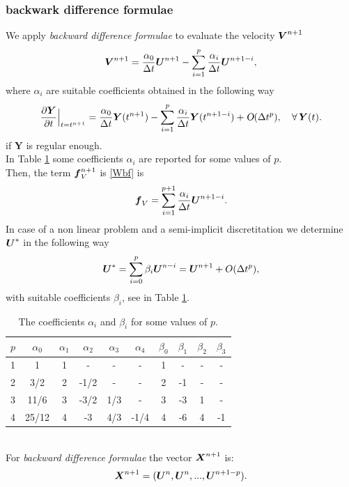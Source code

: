 \documentclass[english,a4paper]{article}
\newcommand{\Xbf}{\text{\mbox{\boldmath $X$}}}
\newcommand{\Ubf}{\text{\mbox{\boldmath $U$}}}
\newcommand{\fbf}{\text{\mbox{\boldmath $f$}}}
\newcommand{\Wbf}{\text{\mbox{\boldmath $V$}}}
\newcommand{\xx}{\boldsymbol}
\begin{document}
\subsubsection{backwark difference formulae}\label{bdf}%
We apply  {\sl backward difference formulae}  to evaluate  the velocity $\Wbf^{n+1}$
\begin{equation}
\Wbf^{n+1}= \frac{\alpha_0}{\Delta t}\Ubf^{n+1}-\sum_{i=1}^p\frac{\alpha_i}{\Delta t} \xx U^{n+1-i},
\end{equation}
where  $\alpha_i$  are suitable coefficients obtained in the
following way
\begin{equation*}
\frac{\partial \xx Y}{\partial t}\Big|_{t=t^{n+1}} =
\frac{\alpha_0}{\Delta t}  \xx
Y(t^{n+1})-\sum_{i=1}^p\frac{\alpha_i}{\Delta t}\xx
Y(t^{n+1-i})+\textsl{O}(\Delta t^p),\quad \forall\, \xx Y(t).
\end{equation*}
if $\xx Y$ is regular enough.\\
In Table \ref{alpha}  some coefficients
$\alpha_i$ are reported for some values of $p$.\\
Then, the term $\fbf_V^{n+1}$ is \eqref{Wbf} is
\begin{equation*}\label{ustart}
\displaystyle\fbf_V=\sum_{i=1}^{p+1}\frac{\alpha_i}{\Delta
  t}\Ubf^{n+1-i}.
\end{equation*}
In case of a non linear problem and a semi-implicit discretitation we determine  $\Ubf^*$ in the
following way
\begin{equation}\label{ustart}
\Ubf^*=\sum_{i=0}^p \beta_i\Ubf^{n-i}=\Ubf^{n+1}+O(\Delta t^p),
\end{equation}
with suitable coefficients  $\beta_i$, see  in Table \ref{alpha}.
\begin{table}[!h]
\begin{center}
\begin{tabular}{|c | c c c c c |c c c c| }
\hline
$p$ & $\alpha_0$ & $\alpha_1$ & $\alpha_2 $ & $\alpha_3$ & $\alpha_4$
& $\beta_0$ & $\beta_1$ & $\beta_2$ & $\beta_3$\\
\hline
1   &     1      &     1     &    -      &    -     &      -   &   1      &    -      &     -   &    -     \\
2   &     3/2    &     2     &   -1/2    &    -     &     -    &   2      &   -1      &     -   &    -     \\
3   &    11/6    &     3     &    -3/2   &    1/3   &     -    &   3      &   -3      &    1    &    -     \\
4   &    25/12   &     4     &   -3      &    4/3   &     -1/4 &   4      &   -6      &    4    &   -1     \\
\hline
\end{tabular}
\caption{The coefficients $\alpha_i$  and $\beta_i$ for some values of
$p$.}\label{alpha}
\end{center}
\end{table}
\\
For  {\sl backward difference formulae} the vector $\Xbf^{n+1}$ is:
$$\Xbf^{n+1}=(\Ubf^{n}, \Ubf^n,..., \Ubf^{n+1-p}).$$
\end{document}
